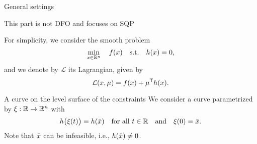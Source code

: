 \documentclass[
]{talk}
\newcommand*{\ceq}{h}
\newcommand*{\iter}[1][]{x\ifblank{#1}{}{_{#1}}}
\newcommand*{\lag}{\mathcal{L}}
\newcommand*{\lmeq}[1][]{\mu\ifblank{#1}{}{_{#1}}}
\newcommand*{\obj}{f}
\begin{document}
\begin{frame}{General settings}
    \begin{block}{}
         This part is \alert{not} DFO and focuses on SQP
    \end{block}

    For simplicity, we consider the \alert{smooth} problem
    \begin{equation*}
        \min_{\iter \in \R^n} \quad \obj(\iter) \quad \textrm{s.t.} \quad \ceq(\iter) = 0\text{,}
    \end{equation*}
    and we denote by $\lag$ its Lagrangian, given by
    \begin{equation*}
        \lag(\iter, \lmeq) = \obj(\iter) + \lmeq^{\T} \ceq(\iter)\text{.}
    \end{equation*}

    \begin{block}{A curve on the level surface of the constraints}
        We consider a \alert{curve} parametrized by $\xi : \mathbb{R} \to \mathbb{R}^n$ with
        \begin{equation*}
            \ceq\big(\xi(t)\big) = \ceq(\bar{\iter}) \quad \text{for all $t \in \R$} \quad \text{and} \quad \xi(0) = \bar{\iter}\text{.}
        \end{equation*}
        Note that $\bar{\iter}$ can be \alert{infeasible}, i.e., $\ceq(\bar{\iter}) \neq 0$.
    \end{block}
\end{frame}
\end{document}
